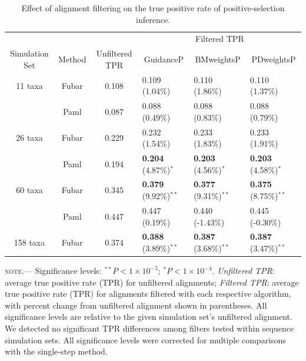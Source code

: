 \documentclass[10pt]{article}
\begin{document}
\begin{table}
\caption {\label{tab:casemodel} Effect of alignment filtering on the true positive rate of positive-selection inference.}
\begin{tabular}{c c c l l l}
\hline\noalign{\smallskip}
& & & \multicolumn{3}{c}{Filtered TPR} \\
\cline{4-6}\noalign{\smallskip}
Simulation Set & Method & Unfiltered TPR & \multicolumn{1}{c}{GuidanceP} & \multicolumn{1}{c}{BMweightsP} & \multicolumn{1}{c}{PDweightsP} \\ 
\hline\noalign{\smallskip}
11 taxa  & Fubar & 0.108 & 0.109  (1.04\%)   & 0.110  (1.86\%)  & 0.110  (1.37\%)        \\
              & Paml &  0.087 & 0.088  (0.49\%) &  0.088  (0.83\%)   & 0.088  (0.79\%)        \\
\hline
26 taxa   & Fubar &  0.229 & 0.232 (1.54\%)  & 0.233 (1.83\%) & 0.233 (1.91\%)         \\
              & Paml & 0.194 & \textbf{0.204} (4.87\%)$^{\ast}$ & \textbf{0.203} (4.56\%)$^{\ast}$ & \textbf{0.203} (4.58\%)$^{\ast}$   \\
\hline
60 taxa  & Fubar & 0.345 & \textbf{0.379} (9.92\%)$^{\ast\ast}$ & \textbf{0.377} (9.31\%)$^{\ast\ast}$ & \textbf{0.375} (8.75\%)$^{\ast\ast}$  \\
              & Paml & 0.447 & 0.447 (0.19\%) & 0.440 (-1.43\%) & 0.445 (-0.30\%) \\
\hline
158 taxa & Fubar & 0.374 & \textbf{0.388} (3.89\%)$^{\ast\ast}$ & \textbf{0.387} (3.68\%)$^{\ast\ast}$ & \textbf{0.387} (3.47\%)$^{\ast\ast}$  \\
\hline
\end{tabular}
\newline
\textsc{note.}--- Significance levels: $^{\ast\ast} P < 1\times10^{-5}$; $^{\ast} P < 1\times10^{-4}$. \textit{Unfiltered TPR}: average true positive rate (TPR) for unfiltered alignments; \textit{Filtered TPR}: average true positive rate (TPR) for alignments filtered with each respective algorithm, with percent change from unfiltered alignment shown in parentheses. All significance levels are relative to the given simulation set's unfiltered alignment. We detected no significant TPR differences among filters tested within sequence simulation sets. All significance levels were corrected for multiple comparisons with the single-step method.
\end{table}




	
\end{document}
